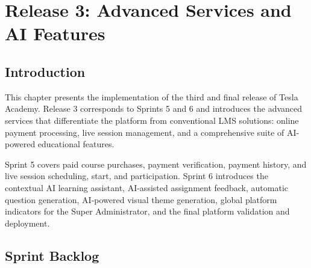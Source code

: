 \begingroup
\renewcommand{\baselinestretch}{0.85}
\chapter{Release 3: Advanced Services and AI Features}
\minitoc
\endgroup
\newpage

\section*{Introduction}

This chapter presents the implementation of the third and final release of Tesla Academy.
Release 3 corresponds to Sprints 5 and 6 and introduces the advanced services that
differentiate the platform from conventional LMS solutions: online payment processing,
live session management, and a comprehensive suite of AI-powered educational features.

Sprint 5 covers paid course purchases, payment verification, payment history, and live
session scheduling, start, and participation. Sprint 6 introduces the contextual AI
learning assistant, AI-assisted assignment feedback, automatic question generation,
AI-powered visual theme generation, global platform indicators for the Super Administrator,
and the final platform validation and deployment.

\section{Sprint Backlog}


